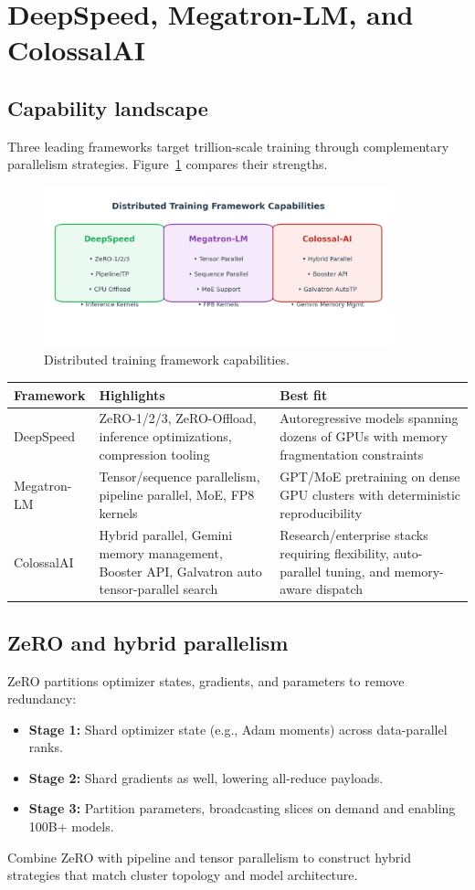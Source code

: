 \documentclass{article}
\begin{document}
\section{DeepSpeed, Megatron-LM, and ColossalAI}
\subsection{Capability landscape}
Three leading frameworks target trillion-scale training through complementary parallelism strategies. Figure~\ref{fig:distributed_landscape_en_tf} compares their strengths.
\begin{figure}[H]
  \centering
  \includegraphics[width=0.9\textwidth]{distributed_frameworks.png}
  \caption{Distributed training framework capabilities.}
  \label{fig:distributed_landscape_en_tf}
\end{figure}
\begin{longtable}{p{3.2cm}p{5cm}p{6cm}}
\toprule
Framework & Highlights & Best fit \\
\midrule
DeepSpeed & ZeRO-1/2/3, ZeRO-Offload, inference optimizations, compression tooling & Autoregressive models spanning dozens of GPUs with memory fragmentation constraints \\
Megatron-LM & Tensor/sequence parallelism, pipeline parallel, MoE, FP8 kernels & GPT/MoE pretraining on dense GPU clusters with deterministic reproducibility \\
ColossalAI & Hybrid parallel, Gemini memory management, Booster API, Galvatron auto tensor-parallel search & Research/enterprise stacks requiring flexibility, auto-parallel tuning, and memory-aware dispatch \\
\bottomrule
\end{longtable}

\subsection{ZeRO and hybrid parallelism}
ZeRO partitions optimizer states, gradients, and parameters to remove redundancy:
\begin{itemize}
  \item \textbf{Stage 1:} Shard optimizer state (e.g., Adam moments) across data-parallel ranks.
  \item \textbf{Stage 2:} Shard gradients as well, lowering all-reduce payloads.
  \item \textbf{Stage 3:} Partition parameters, broadcasting slices on demand and enabling 100B+ models.
\end{itemize}
Combine ZeRO with pipeline and tensor parallelism to construct hybrid strategies that match cluster topology and model architecture.
\end{document}
